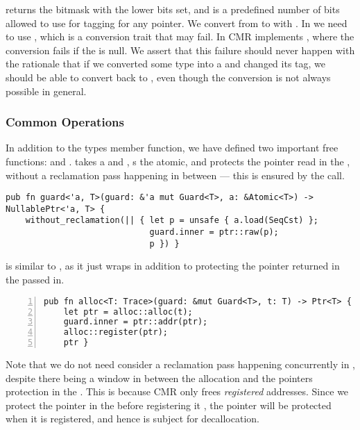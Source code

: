 returns the bitmask with the  lower bits set, and  is a
predefined number of bits allowed to use for tagging for any pointer. We convert from  to
 with  .  In  we need to use
, which is a conversion trait that may fail. In CMR  implements
, where the conversion fails if the  is null. We
assert that this failure should never happen  with the rationale that if we converted
some type  into a  and changed its tag, we should be able to convert back
to , even though the conversion is not always possible in general.





\subsubsection{Common Operations}

In addition to the types member function, we have defined two important free functions:
 and .
 takes a  and , s the atomic, and protects
the pointer read in the , without a reclamation pass happening in between --- this is
ensured by the  call.

\begin{lstlisting}
pub fn guard<'a, T>(guard: &'a mut Guard<T>, a: &Atomic<T>) -> NullablePtr<'a, T> {
    without_reclamation(|| { let p = unsafe { a.load(SeqCst) };
                             guard.inner = ptr::raw(p);
                             p }) }
\end{lstlisting}
 is similar to , as it just wraps  in addition
to protecting the pointer returned in the  passed in.
\begin{lstlisting}[numbers=left, numberstyle=\color{gray}\ttfamily{}A]
pub fn alloc<T: Trace>(guard: &mut Guard<T>, t: T) -> Ptr<T> {
    let ptr = alloc::alloc(t);
    guard.inner = ptr::addr(ptr);
    alloc::register(ptr);
    ptr }
\end{lstlisting}

Note that we do not need consider a reclamation pass happening concurrently in ,
despite there being a window in between the allocation and the pointers protection in the
. This is because CMR only frees \emph{registered} addresses. Since we protect the
pointer in the   before registering it , the pointer will be
protected when it is registered, and hence is subject for decallocation.



